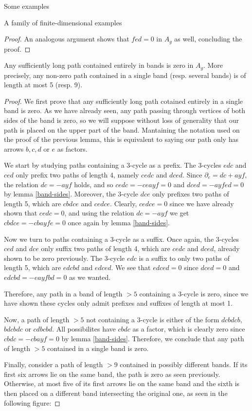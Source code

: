 \begin{chapter}{Some examples}
\begin{section}{A family of finite-dimensional examples}
\begin{proof}
An analogous argument shows that $fed=0$ in $A_g$ as well, concluding the proof. 
\end{proof}

\begin{lemma} \label{long-band-paths} Any sufficiently long path contained entirely in bands is zero in $A_g$. More precisely, any non-zero path contained in a single band (resp. several bands) is of length at most 5 (resp. 9).
\end{lemma}
\begin{proof} We first prove that any sufficiently long path cotained entirely in a single band is zero. As we have already seen, any path passing through vertices of both sides of the band is zero, so we will suppose without loss of generality that our path is placed on the upper part of the band. Mantaining the notation used on the proof of the previous lemma, this is equivalent to saying our path only has arrows $b, c, d$ or $e$ as factors.

We start by studying paths containing a $3$-cycle as a prefix. The $3$-cycles $edc$ and $ced$ only prefix two paths of length 4, namely $cedc$ and $dced$. Since $\partial_e = dc + ayf$, the relation $dc = -ayf$ holds, and so $cedc=-ceayf=0$ and $dced=-ayfed=0$ by lemma \ref{band-sides}. Moreover, the $3$-cycle $dce$ only prefixes two paths of length 5, which are $cbdce$ and $cedce$. Clearly, $cedce=0$ since we have already shown that $cedc=0$, and using the relation $dc=-ayf$ we get $cbdce = - cbayfe=0$ once again by lemma \ref{band-sides}.

Now we turn to paths containing a $3$-cycle as a suffix. Once again, the $3$-cycles $ced$ and $dce$ only suffix two paths of length 4, which are $cedc$ and $dced$, already shown to be zero previously. The $3$-cycle $edc$ is a suffix to only two paths of length 5, which are $edcbd$ and $edced$. We see that $edced=0$ since $dced=0$ and $edcbd=-eayfbd=0$ as we wanted.

Therefore, any path in a band of length $>5$ containing a 3-cycle is zero, since we have shown these cycles only admit prefixes and suffixes of length at most 1.

Now, a path of length $>5$ not containing a 3-cycle is either of the form $dcbdcb$, $bdcbdc$ or $cdbcbd$. All possibilites have $cbdc$ as a factor, which is clearly zero since $cbdc = -cbayf = 0$ by lemma \ref{band-sides}. Therefore, we conclude that any path of length $>5$ contained in a single band is zero.

Finally, consider a path of length $>9$ contained in possibly different bands. If its first six arrows lie on the same band, the path is zero as seen previously. Otherwise, at most five of its first arrows lie on the same band and the sixth is then placed on a different band intersecting the original one, as seen in the following figure:


\end{proof}
\end{section}
\end{chapter}
